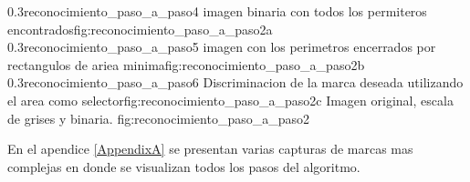 \subfigabc
         {0.3}{reconocimiento_paso_a_paso4} {imagen binaria con todos los permiteros encontrados}{fig:reconocimiento_paso_a_paso2a}
         {0.3}{reconocimiento_paso_a_paso5} {imagen con los perimetros encerrados por rectangulos de ariea minima}{fig:reconocimiento_paso_a_paso2b}
         {0.3}{reconocimiento_paso_a_paso6} {Discriminacion de la marca deseada utilizando el area como selector}{fig:reconocimiento_paso_a_paso2c}
         {Imagen original, escala de grises y binaria.}
         {fig:reconocimiento_paso_a_paso2}

         En el apendice \ref{AppendixA} se presentan varias capturas de marcas mas complejas en donde se visualizan todos los pasos del algoritmo. 

